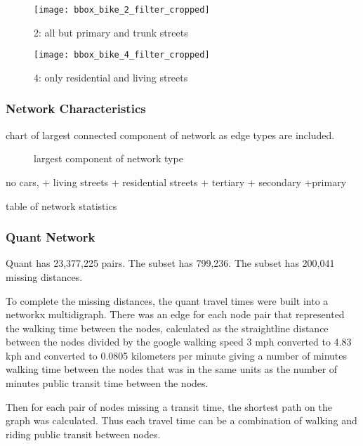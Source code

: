 \begin{figure}
  \centering
  \texttt{[image: bbox\_bike\_2\_filter\_cropped]}
  \caption{2: all but primary and trunk streets}
  \label{fig:sub2}
\end{figure}



\begin{figure}
  \centering
  \texttt{[image: bbox\_bike\_4\_filter\_cropped]}
  \caption{4: only residential and living streets}
  \label{fig:sub2}
\end{figure}

\subsubsection{Network Characteristics}

chart of largest connected component of network as edge types are included. 

\begin{figure}
\centering
\caption{largest component of network type}
\label{fig:connected_component}
\end{figure}

no cars,
+ living streets
+ residential streets
+ tertiary 
+ secondary
+primary

\begin{table}
\centering
\caption{table of network statistics}
\label{table:network_stats}
\end{table}
 
\subsubsection{Quant Network}

Quant has 23,377,225 pairs. The subset has 799,236. The subset has 200,041 missing distances. 

To complete the missing distances, the quant travel times were built into a networkx multidigraph. There was an edge for each node pair that represented the walking time between the nodes, calculated as the straightline distance between the nodes divided by the google walking speed 3 mph converted to 4.83 kph and converted to  0.0805 kilometers per minute giving a number of minutes walking time between the nodes that was in the same units as the number of minutes public transit time between the nodes. 

Then for each pair of nodes missing a transit time, the shortest path on the graph was calculated. Thus each travel time can be a combination of walking and riding public transit between nodes. 

